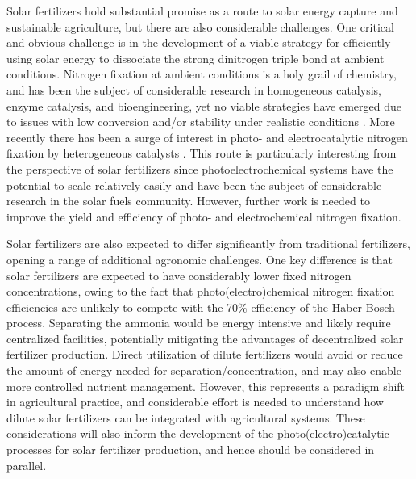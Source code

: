 Solar fertilizers hold substantial promise as a route to solar energy capture and sustainable agriculture, but there are also considerable challenges. One critical and obvious challenge is in the development of a viable strategy for efficiently using solar energy to dissociate the strong dinitrogen triple bond at ambient conditions. Nitrogen fixation at ambient conditions is a holy grail of chemistry, and has been the subject of considerable research in homogeneous catalysis, enzyme catalysis, and bioengineering, yet no viable strategies have emerged due to issues with low conversion and/or stability under realistic conditions \cite{Vicente_2017}. %
More recently there has been a surge of interest in photo- and electrocatalytic nitrogen fixation by heterogeneous catalysts \cite{}. This route is particularly interesting from the perspective of solar fertilizers since photoelectrochemical systems have the potential to scale relatively easily and have been the subject of considerable research in the solar fuels community. However, further work is needed to improve the yield and efficiency of photo- and electrochemical nitrogen fixation. %

Solar fertilizers are also expected to differ significantly from traditional fertilizers, opening a range of additional agronomic challenges. One key difference is that solar fertilizers are expected to have considerably lower fixed nitrogen concentrations, owing to the fact that photo(electro)chemical nitrogen fixation efficiencies are unlikely to compete with the 70\% efficiency of the Haber-Bosch process. Separating the ammonia would be energy intensive and likely require centralized facilities, potentially mitigating the advantages of decentralized solar fertilizer production. Direct utilization of dilute fertilizers would avoid or reduce the amount of energy needed for separation/concentration, and may also enable more controlled nutrient management. However, this represents a paradigm shift in agricultural practice, and considerable effort is needed to understand how dilute solar fertilizers can be integrated with agricultural systems. These considerations will also inform the development of the photo(electro)catalytic processes for solar fertilizer production, and hence should be considered in parallel.

